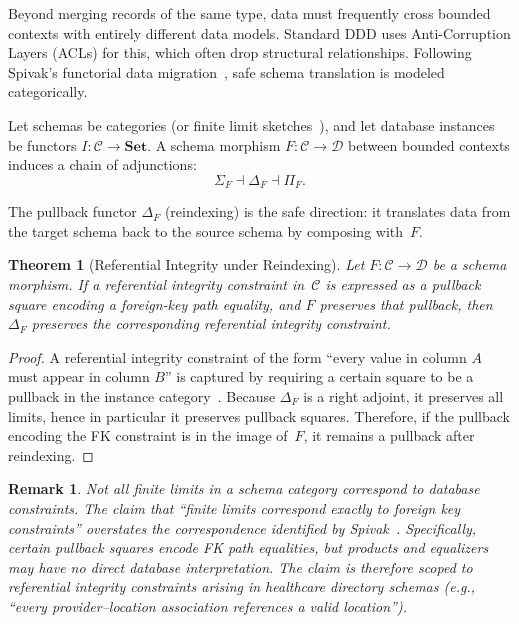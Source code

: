 \documentclass[11pt,a4paper]{article}
\newtheorem{theorem}[definition]{Theorem}
\newtheorem{remark}[definition]{Remark}
\begin{document}
Beyond merging records of the same type, data must frequently cross
bounded contexts with entirely different data models. Standard DDD uses
Anti-Corruption Layers (ACLs) for this, which often drop structural
relationships. Following Spivak's functorial data
migration~\citep{spivak2012,spivak2014}, safe schema translation is modeled
categorically.

Let schemas be categories (or finite limit sketches~\citep{johnsonrosebrugh2002}),
and let database instances be functors $I:\mathcal{C}\to\mathbf{Set}$.
A schema morphism $F:\mathcal{C}\to\mathcal{D}$ between bounded
contexts induces a chain of adjunctions:
\[
  \Sigma_F \dashv \Delta_F \dashv \Pi_F.
\]

The pullback functor $\Delta_F$ (reindexing) is the safe direction:
it translates data from the target schema back to the source schema
by composing with~$F$.

\begin{theorem}[Referential Integrity under Reindexing]
\label{thm:schema}
Let $F:\mathcal{C}\to\mathcal{D}$ be a schema morphism. If a
referential integrity constraint in~$\mathcal{C}$ is expressed as a
pullback square encoding a foreign-key path equality, and $F$ preserves
that pullback, then $\Delta_F$ preserves the corresponding referential
integrity constraint.
\end{theorem}

\begin{proof}
A referential integrity constraint of the form ``every value in column
$A$ must appear in column $B$'' is captured by requiring a certain
square to be a pullback in the instance category~\citep{spivak2012}.
Because $\Delta_F$ is a right adjoint, it preserves all limits, hence in
particular it preserves pullback squares. Therefore, if the pullback
encoding the FK constraint is in the image of~$F$, it remains a
pullback after reindexing.
\end{proof}

\begin{remark}
\label{rem:not-all-limits}
Not all finite limits in a schema category correspond to database
constraints. The claim that ``finite limits correspond exactly to foreign
key constraints'' overstates the correspondence identified by
Spivak~\citep{spivak2012}. Specifically, \emph{certain} pullback
squares encode FK path equalities, but products and equalizers may have
no direct database interpretation. The claim is therefore scoped to
referential integrity constraints arising in healthcare directory schemas
(e.g., ``every provider--location association references a valid
location'').
\end{remark}
\end{document}
